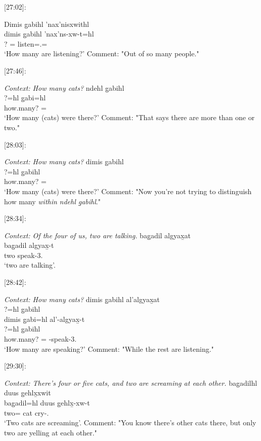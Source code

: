 [27:02]: 
\begin{exe}
    \ex \glll
    Dimis g̱abihl 'nax'nisxwithl  \\
    dimis g̱abihl 'nax'ns-xw-t=hl  \\
    ? \Cnt=\Cn{} listen=.\Ii=\Cn{} \\
    \glt `How many are listening?'
    Comment: "Out of so many people."
\end{exe}

[27:46]:
\begin{exe}
    \ex \textit{Context: How many cats?} \glll 
    ndehl g̱abihl \\
    ?=hl g̱abi=hl \\
    how.many? \Cnt=\Cn{} \\
    \glt `How many (cats) were there?' 
    Comment: "That says there are more than one or two."
\end{exe}

[28:03]:
\begin{exe}
    \ex \textit{Context: How many cats?} \glll 
    dimis g̱abihl \\
    ?=hl g̱abihl \\
    how.many? \Cnt=\Cn{}  \\
    \glt `How many (cats) were there?'
    Comment: "Now you're not trying to distinguish how many \textit{within} \textit{ndehl g̱abihl}."
\end{exe}

[28:34]:
\begin{exe}
    \ex \textit{Context: Of the four of us, two are talking.} \glll 
    bag̱adil algyax̱at \\
    bag̱adil algyax̱-t \\
    two speak-3.\Ii  \\
    \glt `two are talking'.
\end{exe}
 
[28:42]:
\begin{exe}
    \ex \textit{Context: How many cats?} \glll 
    dimis g̱abihl al'algyax̱at \\
    ?=hl g̱abihl \\
    dimis g̱abi=hl al'-algyax̱-t \\
    ?=hl g̱abihl \\
    how.many? \Cnt=\Cn{} \Pl-speak-3.\Ii \\
    \glt `How many are speaking?'
    Comment: "While the rest are listening."
\end{exe}

[29:30]:
\begin{exe}
    \ex \textit{Context: There's four or five cats, and two are screaming at each other.} \glll 
    bag̱adilhl duus g̱ehlx̱xwit \\
    bag̱adil=hl duus g̱ehlx̱-xw-t \\
    two=\Cn{} cat cry-.\Ii  \\
    \glt `Two cats are screaming'.
    Comment: "You know there's other cats there, but only two are yelling at each other."
\end{exe}

